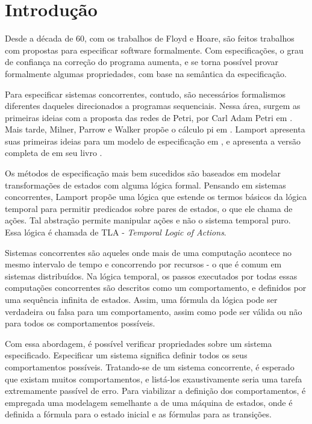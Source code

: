 \chapter{Introdução}
\label{introducao}

Desde a década de 60, com os trabalhos de Floyd e Hoare, são feitos trabalhos com propostas para especificar software formalmente. Com especificações, o grau de confiança na correção do programa aumenta, e se torna possível provar formalmente algumas propriedades, com base na semântica da especificação.

Para especificar sistemas concorrentes, contudo, são necessários formalismos diferentes daqueles direcionados a programas sequenciais. Nessa área, surgem as primeiras ideias com a proposta das redes de Petri, por Carl Adam Petri em \cite{petri}. Mais tarde, Milner, Parrow e Walker propõe o cálculo pi em \cite{picalculus}. Lamport apresenta suas primeiras ideias para um modelo de especificação em \cite{first-lamport}, e apresenta a versão completa de \TLA em seu livro \cite{specifying-systems}.

Os métodos de especificação mais bem sucedidos são baseados em modelar transformações de estados com alguma lógica formal. Pensando em sistemas concorrentes, Lamport propõe uma lógica que estende os termos básicos da lógica temporal para permitir predicados sobre pares de estados, o que ele chama de ações. Tal abstração permite manipular ações e não o sistema temporal puro. Essa lógica é chamada de TLA - \textit{Temporal Logic of Actions}.

Sistemas concorrentes são aqueles onde mais de uma computação acontece no mesmo intervalo de tempo e concorrendo por recursos - o que é comum em sistemas distribuídos. Na lógica temporal, os passos executados por todas essas computações concorrentes são descritos como um comportamento, e definidos por uma sequência infinita de estados. Assim, uma fórmula da lógica pode ser verdadeira ou falsa para um comportamento, assim como pode ser válida ou não para todos os comportamentos possíveis.

Com essa abordagem, é possível verificar propriedades sobre um sistema especificado. Especificar um sistema significa definir todos os seus comportamentos possíveis. Tratando-se de um sistema concorrente, é esperado que existam muitos comportamentos, e listá-los exaustivamente seria uma tarefa extremamente passível de erro. Para viabilizar a definição dos comportamentos, é empregada uma modelagem semelhante a de uma máquina de estados, onde é definida a fórmula para o estado inicial e as fórmulas para as transições.

